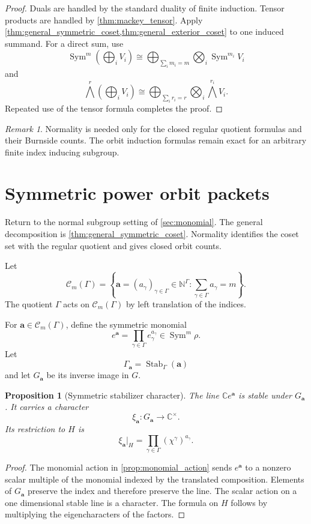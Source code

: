 \documentclass{aomart}
\newtheorem{proposition}[proposition]{Proposition}
\theoremstyle{definition}
\theoremstyle{remark}
\newtheorem{remark}[remark]{Remark}
\newcommand{\CC}{\mathbb C}
\newcommand{\NN}{\mathbb N}
\newcommand{\Sym}{\operatorname{Sym}}
\newcommand{\Stab}{\operatorname{Stab}}
\newcommand{\calC}{\mathcal C}
\begin{document}
\begin{proof}
Duals are handled by the standard duality of finite induction. Tensor products are handled by \cref{thm:mackey_tensor}. Apply \cref{thm:general_symmetric_coset,thm:general_exterior_coset} to one induced summand. For a direct sum, use
\[
\Sym^m\left(\bigoplus_iV_i\right)
\cong
\bigoplus_{\sum_im_i=m}
\bigotimes_i\Sym^{m_i}V_i
\]
and
\[
\bigwedge^r\left(\bigoplus_iV_i\right)
\cong
\bigoplus_{\sum_ir_i=r}
\bigotimes_i\bigwedge^{r_i}V_i.
\]
Repeated use of the tensor formula completes the proof.
\end{proof}

\begin{remark}\label{rem:normal_closed_counts}
Normality is needed only for the closed regular quotient formulas and their Burnside counts. The orbit induction formulas remain exact for an arbitrary finite index inducing subgroup.
\end{remark}

\section{Symmetric power orbit packets}\label{sec:symmetric}

Return to the normal subgroup setting of \cref{sec:monomial}. The general decomposition is \cref{thm:general_symmetric_coset}. Normality identifies the coset set with the regular quotient and gives closed orbit counts.

Let
\[
\calC_m(\Gamma)
=
\left\{
\bm a=(a_\gamma)_{\gamma\in\Gamma}
\in\NN^{\Gamma}:
\sum_{\gamma\in\Gamma}a_\gamma=m
\right\}.
\]
The quotient \(\Gamma\) acts on \(\calC_m(\Gamma)\) by left translation of the indices.

For \(\bm a\in\calC_m(\Gamma)\), define the symmetric monomial
\[
e^{\bm a}
=
\prod_{\gamma\in\Gamma}e_\gamma^{a_\gamma}
\in
\Sym^m\rho.
\]
Let
\[
\Gamma_{\bm a}=\Stab_\Gamma(\bm a)
\]
and let \(G_{\bm a}\) be its inverse image in \(G\).

\begin{proposition}[Symmetric stabilizer character]\label{prop:symmetric_stabilizer_character}
The line \(\CC e^{\bm a}\) is stable under \(G_{\bm a}\). It carries a character
\[
\xi_{\bm a}:G_{\bm a}\longrightarrow\CC^{\times}.
\]
Its restriction to \(H\) is
\[
\boxed{
\xi_{\bm a}|_H
=
\prod_{\gamma\in\Gamma}
(\chi^\gamma)^{a_\gamma}.
}
\]
\end{proposition}

\begin{proof}
The monomial action in \cref{prop:monomial_action} sends \(e^{\bm a}\) to a nonzero scalar multiple of the monomial indexed by the translated composition. Elements of \(G_{\bm a}\) preserve the index and therefore preserve the line. The scalar action on a one dimensional stable line is a character. The formula on \(H\) follows by multiplying the eigencharacters of the factors.
\end{proof}
\end{document}
